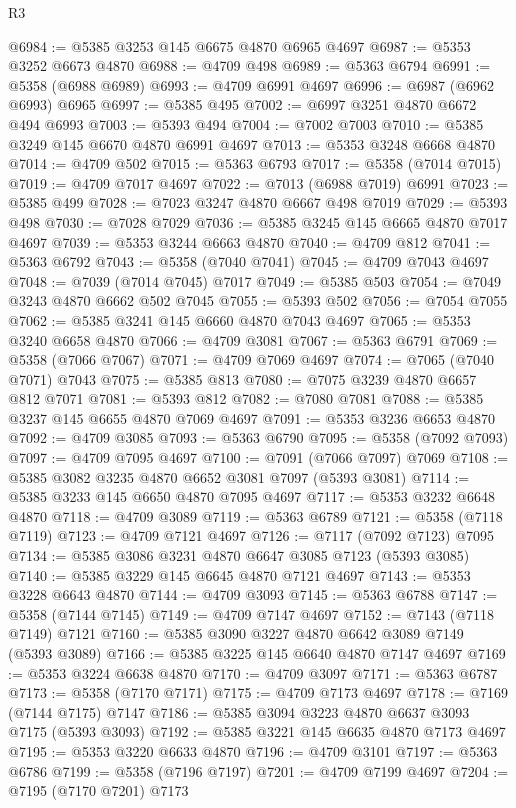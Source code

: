 \begin{lexlean}{R3}
\begin{coremodule}
@6984 := @5385 @3253 @145 @6675 @4870 @6965 @4697
@6987 := @5353 @3252 @6673 @4870
@6988 := @4709 @498
@6989 := @5363 @6794
@6991 := @5358 (@6988 @6989)
@6993 := @4709 @6991 @4697
@6996 := @6987 (@6962 @6993) @6965
@6997 := @5385 @495
@7002 := @6997 @3251 @4870 @6672 @494 @6993
@7003 := @5393 @494
@7004 := @7002 @7003
@7010 := @5385 @3249 @145 @6670 @4870 @6991 @4697
@7013 := @5353 @3248 @6668 @4870
@7014 := @4709 @502
@7015 := @5363 @6793
@7017 := @5358 (@7014 @7015)
@7019 := @4709 @7017 @4697
@7022 := @7013 (@6988 @7019) @6991
@7023 := @5385 @499
@7028 := @7023 @3247 @4870 @6667 @498 @7019
@7029 := @5393 @498
@7030 := @7028 @7029
@7036 := @5385 @3245 @145 @6665 @4870 @7017 @4697
@7039 := @5353 @3244 @6663 @4870
@7040 := @4709 @812
@7041 := @5363 @6792
@7043 := @5358 (@7040 @7041)
@7045 := @4709 @7043 @4697
@7048 := @7039 (@7014 @7045) @7017
@7049 := @5385 @503
@7054 := @7049 @3243 @4870 @6662 @502 @7045
@7055 := @5393 @502
@7056 := @7054 @7055
@7062 := @5385 @3241 @145 @6660 @4870 @7043 @4697
@7065 := @5353 @3240 @6658 @4870
@7066 := @4709 @3081
@7067 := @5363 @6791
@7069 := @5358 (@7066 @7067)
@7071 := @4709 @7069 @4697
@7074 := @7065 (@7040 @7071) @7043
@7075 := @5385 @813
@7080 := @7075 @3239 @4870 @6657 @812 @7071
@7081 := @5393 @812
@7082 := @7080 @7081
@7088 := @5385 @3237 @145 @6655 @4870 @7069 @4697
@7091 := @5353 @3236 @6653 @4870
@7092 := @4709 @3085
@7093 := @5363 @6790
@7095 := @5358 (@7092 @7093)
@7097 := @4709 @7095 @4697
@7100 := @7091 (@7066 @7097) @7069
@7108 := @5385 @3082 @3235 @4870 @6652 @3081 @7097 (@5393 @3081)
@7114 := @5385 @3233 @145 @6650 @4870 @7095 @4697
@7117 := @5353 @3232 @6648 @4870
@7118 := @4709 @3089
@7119 := @5363 @6789
@7121 := @5358 (@7118 @7119)
@7123 := @4709 @7121 @4697
@7126 := @7117 (@7092 @7123) @7095
@7134 := @5385 @3086 @3231 @4870 @6647 @3085 @7123 (@5393 @3085)
@7140 := @5385 @3229 @145 @6645 @4870 @7121 @4697
@7143 := @5353 @3228 @6643 @4870
@7144 := @4709 @3093
@7145 := @5363 @6788
@7147 := @5358 (@7144 @7145)
@7149 := @4709 @7147 @4697
@7152 := @7143 (@7118 @7149) @7121
@7160 := @5385 @3090 @3227 @4870 @6642 @3089 @7149 (@5393 @3089)
@7166 := @5385 @3225 @145 @6640 @4870 @7147 @4697
@7169 := @5353 @3224 @6638 @4870
@7170 := @4709 @3097
@7171 := @5363 @6787
@7173 := @5358 (@7170 @7171)
@7175 := @4709 @7173 @4697
@7178 := @7169 (@7144 @7175) @7147
@7186 := @5385 @3094 @3223 @4870 @6637 @3093 @7175 (@5393 @3093)
@7192 := @5385 @3221 @145 @6635 @4870 @7173 @4697
@7195 := @5353 @3220 @6633 @4870
@7196 := @4709 @3101
@7197 := @5363 @6786
@7199 := @5358 (@7196 @7197)
@7201 := @4709 @7199 @4697
@7204 := @7195 (@7170 @7201) @7173

\end{coremodule}
\end{lexlean}
